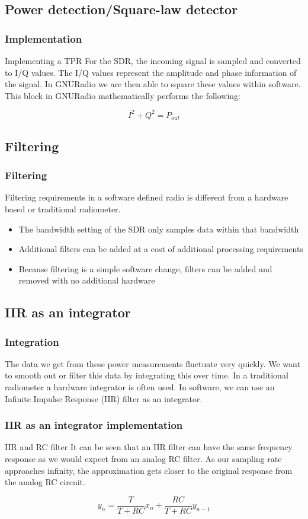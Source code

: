 \documentclass[notes]{beamer}
\begin{document}
\subsection{Power detection/Square-law detector}
\begin{frame}
\frametitle{Implementation}
\begin{block}{Implementing a TPR}
For the SDR, the incoming signal is sampled and converted to I/Q values.  The I/Q values represent the amplitude and phase information of the signal.  In GNURadio we are then able to square these values within software.  This block in GNURadio mathematically performs the following:

\begin{equation}\label{sumIQ}
I^2+Q^2 = P_{out}
\end{equation}
\end{block}
\end{frame}
\subsection{Filtering}
\begin{frame}
\frametitle{Filtering}
Filtering requirements in a software defined radio is different from a hardware based or traditional radiometer.
\begin{itemize}
\item The bandwidth setting of the SDR only samples data within that bandwidth
\item Additional filters can be added at a cost of additional processing requirements
\item Because filtering is a simple software change, filters can be added and removed with no additional hardware
\end{itemize}

\end{frame}
\subsection{IIR as an integrator}
\begin{frame}
\frametitle{Integration}
The data we get from these power measurements fluctuate very quickly.  We want to smooth out or filter this data by integrating this over time.  In a traditional radiometer a hardware integrator is often used.  In software, we can use an Infinite Impulse Response (IIR) filter as an integrator.
\end{frame}
\begin{frame}
\frametitle{IIR as an integrator implementation}
\begin{block}{IIR and RC filter}
It can be seen that an IIR filter can have the same frequency response as we would expect from an analog RC filter.  As our sampling rate approaches infinity, the approximation gets closer to the original response from the analog RC circuit.  
\end{block}
\begin{equation}\label{final_IIR_RC}
y_n=\frac{T}{T+RC}x_n+\frac{RC}{T+RC}y_{n-1}
\end{equation}
\end{frame}
\end{document}
